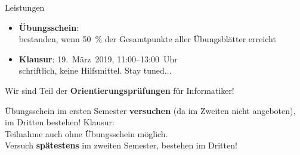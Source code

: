 

\begin{frame}[t]{Leistungen}
	\begin{itemize}
		\item \textbf{Übungsschein}: \\
			  bestanden, wenn 50~\% der Gesamtpunkte aller Übungsblätter erreicht \\
		\item \textbf{Klausur}: 19.~März~2019, 11:00–13:00~Uhr \\
			  schriftlich, keine Hilfsmittel. \quad Stay tuned... 
	\end{itemize}
	\pause
	Wir sind Teil der \textbf{Orientierungsprüfungen} für Informatiker!
	\begin{itemize}
		\implitem Übungsschein im ersten Semester \textbf{versuchen} (da im Zweiten nicht angeboten), im Dritten bestehen! 
		\implitem Klausur: \\
		Teilnahme auch ohne Übungsschein möglich. \\
		Versuch \textbf{spätestens} im zweiten Semester, bestehen im Dritten!
	\end{itemize}
	\pause
\end{frame}

